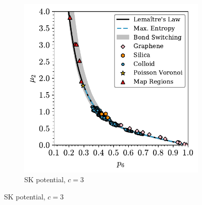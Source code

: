 \begin{figure}[bt]
     \centering
     
      \begin{subfigure}[b]{0.45\textwidth}
         \centering
         \includegraphics[width=\textwidth]{./figures/general_networks/gen_lm.pdf}
         \caption{SK potential, $c=3$}
         \label{fig:lmgena}
     \end{subfigure}
     \hfill
     

\end{figure}
